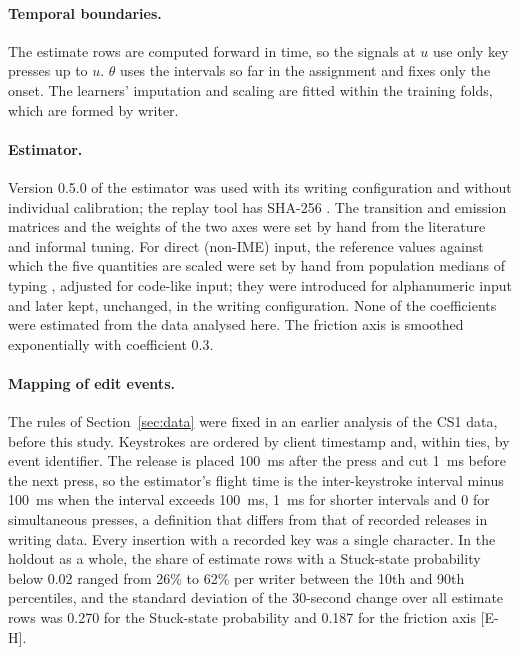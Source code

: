 \paragraph{Temporal boundaries.} The estimate rows are computed forward in time, so the signals at $u$ use only key
presses up to $u$. $\theta$ uses the intervals so far in the assignment and fixes only the onset. The learners' imputation
and scaling are fitted within the training folds, which are formed by writer.

\paragraph{Estimator.} Version 0.5.0 of the estimator was used with its writing configuration and without individual
calibration; the replay tool has SHA-256 \texttt{}. The
transition and emission matrices and the weights of the two axes were set by hand from the literature and informal
tuning. For direct (non-IME) input, the reference values against which the five quantities are scaled were set by hand
from population medians of typing \cite{dhakal2018typing}, adjusted for code-like input; they were introduced for
alphanumeric input and later kept, unchanged, in the writing configuration. None of the coefficients were estimated
from the data analysed here. The friction axis is smoothed exponentially with coefficient 0.3.

\paragraph{Mapping of edit events.} The rules of Section~\ref{sec:data} were fixed in an earlier analysis of the CS1
data, before this study. Keystrokes are ordered by client timestamp and, within ties, by event identifier. The release is
placed 100~ms after the press and cut 1~ms before the next press, so the estimator's flight time is the inter-keystroke
interval minus 100~ms when the interval exceeds 100~ms, 1~ms for shorter intervals and 0 for simultaneous presses, a
definition that differs from that of recorded releases in writing data. Every insertion with a recorded key was a single
character. In the holdout as a whole, the share of estimate rows with a Stuck-state probability below 0.02 ranged from
26\% to 62\% per writer between the 10th and 90th percentiles, and the standard deviation of the 30-second change over
all estimate rows was 0.270 for the Stuck-state probability and 0.187 for the friction axis [E-H].

